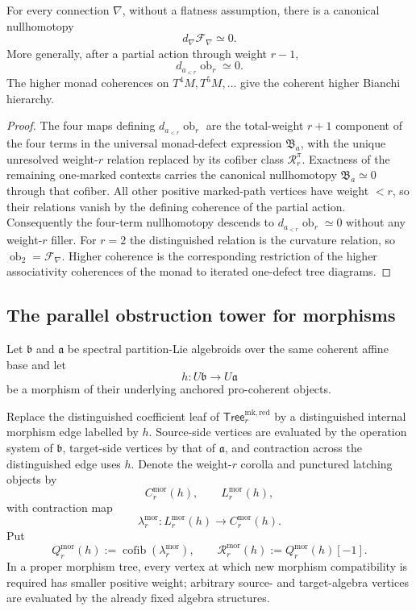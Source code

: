 \begin{theorem}
\label{thm:as-bianchi}
For every connection $\nabla$, without a flatness assumption, there is a
canonical nullhomotopy
\[
\boxed{
    d_\nabla\mathcal F_\nabla\simeq0.
}
\]
More generally, after a partial action through weight $r-1$,
\[
\boxed{
    d_{a_{<r}}\operatorname{ob}_r\simeq0.
}
\]
The higher monad coherences on $T^4M,T^5M,\ldots$ give the coherent higher
Bianchi hierarchy.
\end{theorem}

\begin{proof}
The four maps defining
$d_{a_{<r}}\operatorname{ob}_r$ are the total-weight $r+1$ component of the
four terms in the universal monad-defect expression $\mathfrak B_a$, with the
unique unresolved weight-$r$ relation replaced by its cofiber class
$\mathcal R_r^\pi$.  Exactness of the remaining one-marked contexts carries
the canonical nullhomotopy $\mathfrak B_a\simeq0$ through that cofiber.  All
other positive marked-path vertices have weight $<r$, so their relations
vanish by the defining coherence of the partial action.  Consequently the
four-term nullhomotopy descends to
$d_{a_{<r}}\operatorname{ob}_r\simeq0$ without any weight-$r$ filler.  For
$r=2$ the distinguished relation is the curvature relation, so
$\operatorname{ob}_2=\mathcal F_\nabla$.  Higher coherence is the corresponding
restriction of the higher associativity coherences of the monad to iterated
one-defect tree diagrams.
\end{proof}

\subsection{The parallel obstruction tower for morphisms}

Let $\mathfrak b$ and $\mathfrak a$ be spectral partition-Lie algebroids over
the same coherent affine base and let
\[
    h:U\mathfrak b\longrightarrow U\mathfrak a
\]
be a morphism of their underlying anchored pro-coherent objects.

\begin{construction}
\label{con:as-morphism-latching}
Replace the distinguished coefficient leaf of
$\mathsf{Tree}^{\mathrm{mk,red}}_r$ by a distinguished internal morphism edge
labelled by $h$.  Source-side vertices are evaluated by the operation system of
$\mathfrak b$, target-side vertices by that of $\mathfrak a$, and contraction
across the distinguished edge uses $h$.  Denote the weight-$r$ corolla and
punctured latching objects by
\[
    C_r^{\mathrm{mor}}(h),
    \qquad
    L_r^{\mathrm{mor}}(h),
\]
with contraction map
\[
    \lambda_r^{\mathrm{mor}}:
    L_r^{\mathrm{mor}}(h)
    \longrightarrow
    C_r^{\mathrm{mor}}(h).
\]
Put
\[
\boxed{
    Q_r^{\mathrm{mor}}(h)
    :=
    \operatorname{cofib}(\lambda_r^{\mathrm{mor}}),
    \qquad
    \mathcal R_r^{\mathrm{mor}}(h)
    :=
    Q_r^{\mathrm{mor}}(h)[-1].
}
\]
In a proper morphism tree, every vertex at which new morphism compatibility is
required has smaller positive weight; arbitrary source- and target-algebra
vertices are evaluated by the already fixed algebra structures.
\end{construction}

